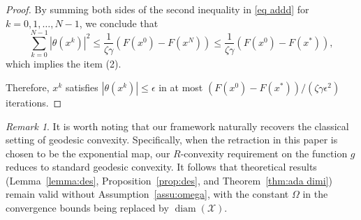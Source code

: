 \documentclass[pdflatex,sn-mathphys-num]{sn-jnl}%
\theoremstyle{definition} %
\theoremstyle{remark} %
\newtheorem*{remark}{Remark} %
\begin{document}
\begin{proof}
        By summing both sides of the second inequality in \eqref{eq addd} for $k=0,1, \ldots, N-1$, we conclude that
        $$
        \sum_{k=0}^{N-1}\left|\theta (x^k)\right|^2 \leq \frac{1}{\zeta \gamma}(F(x^0)-F(x^{N}))\leq \frac{1}{\zeta \gamma}(F(x^0)-F(x^{*})),
        $$
        which implies the item (2).
        
        Therefore, $x^k$ satisfies $\left|\theta (x^k)\right| \leq \epsilon$ in at most $ (F (x^0)-F (x^*)) / (\zeta \gamma \epsilon^2)$ iterations.
    \end{proof}

\begin{remark}
     It is worth noting that our framework naturally recovers the classical setting of geodesic convexity. Specifically, when the retraction in this paper is chosen to be the exponential map, our $R$-convexity requirement on the function $g$ reduces to standard geodesic convexity. 
     It follows that theoretical results (Lemma~\ref{lemma:des}, Proposition~\ref{prop:des}, and Theorem~\ref{thm:ada dimi}) remain valid without Assumption~\ref{assu:omega}, with the constant $\Omega$ in the convergence bounds being replaced by  $\operatorname{diam}(\mathcal{X})$.
    \end{remark}

    
\end{document}
